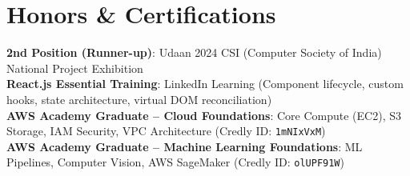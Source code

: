 \documentclass[letterpaper,10.5pt]{article}
\begin{document}
\section{Honors \& Certifications}
 \begin{itemize}[leftmargin=0.15in, label={}]
    \small{\item{
     \textbf{2nd Position (Runner-up)}{: Udaan 2024 CSI (Computer Society of India) National Project Exhibition} \\
     \textbf{React.js Essential Training}{: LinkedIn Learning (Component lifecycle, custom hooks, state architecture, virtual DOM reconciliation)} \\
     \textbf{AWS Academy Graduate -- Cloud Foundations}{: Core Compute (EC2), S3 Storage, IAM Security, VPC Architecture (Credly ID: \texttt{1mNIxVxM})} \\
     \textbf{AWS Academy Graduate -- Machine Learning Foundations}{: ML Pipelines, Computer Vision, AWS SageMaker (Credly ID: \texttt{olUPF91W})}
    }}
 \end{itemize}
\end{document}
